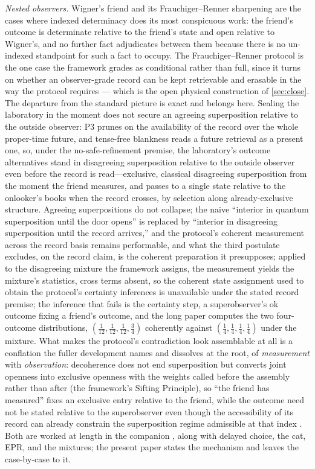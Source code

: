 \documentclass[11pt]{article}
\theoremstyle{definition}
\begin{document}
\emph{Nested observers.} Wigner's friend \cite{wigner1961} and its Frauchiger--Renner sharpening \cite{frauchiger2018quantum} are the cases where indexed determinacy does its most conspicuous work: the friend's outcome is determinate relative to the friend's state and open relative to Wigner's, and no further fact adjudicates between them because there is no un-indexed standpoint for such a fact to occupy. The Frauchiger--Renner protocol is the one case the framework grades as conditional rather than full, since it turns on whether an observer-grade record can be kept retrievable and erasable in the way the protocol requires --- which is the open physical construction of \autoref{sec:close}. The departure from the standard picture is exact and belongs here. Sealing the laboratory in the moment does not secure an agreeing superposition relative to the outside observer: P3 prunes on the availability of the record over the whole proper-time future, and tense-free blankness reads a future retrieval as a present one, so, under the no-safe-refinement premise, the laboratory's outcome alternatives stand in disagreeing superposition relative to the outside observer even before the record is read---exclusive, classical disagreeing superposition from the moment the friend measures, and passes to a single state relative to the onlooker's books when the record crosses, by selection along already-exclusive structure. Agreeing superpositions do not collapse; the naive ``interior in quantum superposition until the door opens'' is replaced by ``interior in disagreeing superposition until the record arrives,'' and the protocol's coherent measurement across the record basis remains performable, and what the third postulate excludes, on the record claim, is the coherent preparation it presupposes; applied to the disagreeing mixture the framework assigns, the measurement yields the mixture's statistics, cross terms absent, so the coherent state assignment used to obtain the protocol's certainty inferences is unavailable under the stated record premise; the inference that fails is the certainty step, a superobserver's ok outcome fixing a friend's outcome, and the long paper computes the two four-outcome distributions, $(\tfrac{1}{12}, \tfrac{1}{12}, \tfrac{1}{12}, \tfrac34)$ coherently against $(\tfrac14, \tfrac14, \tfrac14, \tfrac14)$ under the mixture. What makes the protocol's contradiction look assemblable at all is a conflation the fuller development names and dissolves at the root, of \emph{measurement} with \emph{observation}: decoherence does not end superposition but converts joint openness into exclusive openness with the weights called before the assembly rather than after (the framework's Sifting Principle), so ``the friend has measured'' fixes an exclusive entry relative to the friend, while the outcome need not be stated relative to the superobserver even though the accessibility of its record can already constrain the superposition regime admissible at that index \cite{Aethus}. Both are worked at length in the companion \cite{AethusRealist}, along with delayed choice, the cat, EPR, and the mixtures; the present paper states the mechanism and leaves the case-by-case to it.
\end{document}
